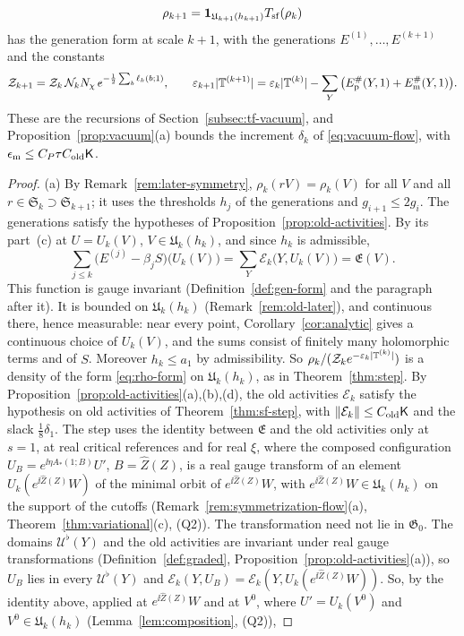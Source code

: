 \begin{theorem}
\begin{enumerate}[label=(\alph*)]
\[
\rho_{k+1}=\mathbf 1_{\mathfrak U_{k+1}(h_{k+1})}T_{\rm sf}(\rho_k)
\]
has the generation form at scale $k+1$, with the generations $E^{(1)},\dots,E^{(k+1)}$ and the constants
\[
\mathcal Z_{k+1}=\mathcal Z_k\,\mathcal N_kN_\chi\,e^{-\frac12\sum_b\ell_k(b;1)},\qquad\varepsilon_{k+1}|\mathbb T^{(k+1)}|=\varepsilon_k|\mathbb T^{(k)}|-\sum_Y\big(E^\#_{\rm p}(Y,1)+E^\#_{\rm m}(Y,1)\big).
\]
These are the recursions of Section~\ref{subsec:tf-vacuum}, and Proposition~\ref{prop:vacuum}(a) bounds the increment $\delta_k$ of \eqref{eq:vacuum-flow}, with $\epsilon_{\rm m}\le C_P\tau C_{\rm old}\mathsf K$.
\end{enumerate}
\end{theorem}

\begin{proof}
(a) By Remark~\ref{rem:later-symmetry}, $\rho_k(rV)=\rho_k(V)$ for all $V$ and all $r\in\mathfrak S_k\supset\mathfrak S_{k+1}$; it uses the thresholds $h_j$ of the generations and $g_{i+1}\le2g_i$. The generations satisfy the hypotheses of Proposition~\ref{prop:old-activities}. By its part~(c) at $U=U_k(V)$, $V\in\mathfrak U_k(h_k)$, and since $h_k$ is admissible,
\[
\sum_{j\le k}\big(E^{(j)}-\beta_jS\big)\big(U_k(V)\big)=\sum_Y\mathcal E_k\big(Y,U_k(V)\big)=\mathfrak E(V).
\]
This function is gauge invariant (Definition~\ref{def:gen-form} and the paragraph after it). It is bounded on $\mathfrak U_k(h_k)$ (Remark~\ref{rem:old-later}), and continuous there, hence measurable: near every point, Corollary~\ref{cor:analytic} gives a continuous choice of $U_k(V)$, and the sums consist of finitely many holomorphic terms and of $S$. Moreover $h_k\le a_1$ by admissibility. So $\rho_k/(\mathcal Z_ke^{-\varepsilon_k|\mathbb T^{(k)}|})$ is a density of the form \eqref{eq:rho-form} on $\mathfrak U_k(h_k)$, as in Theorem~\ref{thm:step}. By Proposition~\ref{prop:old-activities}(a),(b),(d), the old activities $\mathcal E_k$ satisfy the hypothesis on old activities of Theorem~\ref{thm:sf-step}, with $\|\mathcal E_k\|\le C_{\rm old}\mathsf K$ and the slack $\frac18\delta_1$. The step uses the identity between $\mathfrak E$ and the old activities only at $s=1$, at real critical references and for real $\xi$, where the composed configuration $U_B=e^{\ii\eta A_*(1;B)}U'$, $B=\hat Z(Z)$, is a real gauge transform of an element $U_k(e^{\ii\hat Z(Z)}W)$ of the minimal orbit of $e^{\ii\hat Z(Z)}W$, with $e^{\ii\hat Z(Z)}W\in\mathfrak U_k(h_k)$ on the support of the cutoffs (Remark~\ref{rem:symmetrization-flow}(a), Theorem~\ref{thm:variational}(c), (Q2)). The transformation need not lie in $\mathfrak G_0$. The domains $\mathcal U^\flat(Y)$ and the old activities are invariant under real gauge transformations (Definition~\ref{def:graded}, Proposition~\ref{prop:old-activities}(a)), so $U_B$ lies in every $\mathcal U^\flat(Y)$ and $\mathcal E_k(Y,U_B)=\mathcal E_k(Y,U_k(e^{\ii\hat Z(Z)}W))$. So, by the identity above, applied at $e^{\ii\hat Z(Z)}W$ and at $V^0$, where $U'=U_k(V^0)$ and $V^0\in\mathfrak U_k(h_k)$ (Lemma~\ref{lem:composition}, (Q2)),

\end{proof}

